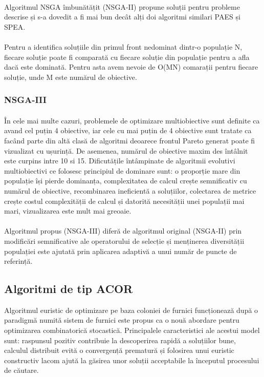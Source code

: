\documentclass[12pt]{article}
\begin{document}
\paragraph{}
Algoritmul NSGA îmbunătățit (NSGA-II) propune soluții pentru probleme descrise și s-a dovedit a fi mai bun decât alți doi algoritmi similari PAES și SPEA.
\paragraph{}
Pentru a identifica soluțiile din primul front nedominat dintr-o populație N, fiecare soluție poate fi comparată cu fiecare soluție din populație pentru a afla dacă este dominată. Pentru asta avem nevoie de O(MN) comarații pentru fiecare soluție, unde M este numărul de obiective. \cite{nsgaii}
\subsubsection{NSGA-III}
\paragraph{}
În cele mai multe cazuri, problemele de optimizare multiobiective sunt definite ca avand cel puțin 4 obiective, iar cele cu mai puțin de 4 obiective sunt tratate ca facând parte din altă clasă de algoritmi deoarece frontul Pareto generat poate fi vizualizat cu ușurință. De asemenea, numărul de obiective maxim des întâlnit este curpins intre 10 si 15. Dificutățile întâmpinate de algoritmii evolutivi multiobiectivi ce folosesc principiul de dominare sunt: o proporție mare din populație își pierde dominanța, complexitatea de calcul crește semnificativ cu numărul de obiective, recombinarea ineficientă a soluțiilor, colectarea de metrice crește costul complexității de calcul și datorită necesității unei populații mai mari, vizualizarea este mult mai greoaie. \cite{nsgaiii}
\paragraph{}
Algoritmul propus (NSGA-III) diferă de algoritmul original (NSGA-II) prin modificări semnificative ale operatorului de selecție și menținerea diversității populației este ajutată prin aplicarea adaptivă a unui număr de puncte de referință. \cite{nsgaiii}
\subsection{Algoritmi de tip ACOR}
Algoritmul euristic de optimizare pe baza coloniei de furnici funcționează după o paradigmă numită sistem de furnici este propus ca o nouă abordare pentru optimizarea combinatorică stocastică. Principalele caracteristici ale acestui model sunt: raspunsul pozitiv contribuie la descoperirea rapidă a soluțiilor bune, calculul distribuit evită o convergență prematură și folosirea unui euristic constructiv lacom ajută la găsirea unor soluții acceptabile la începutul procesului de căutare.\cite{aco}
\end{document}
